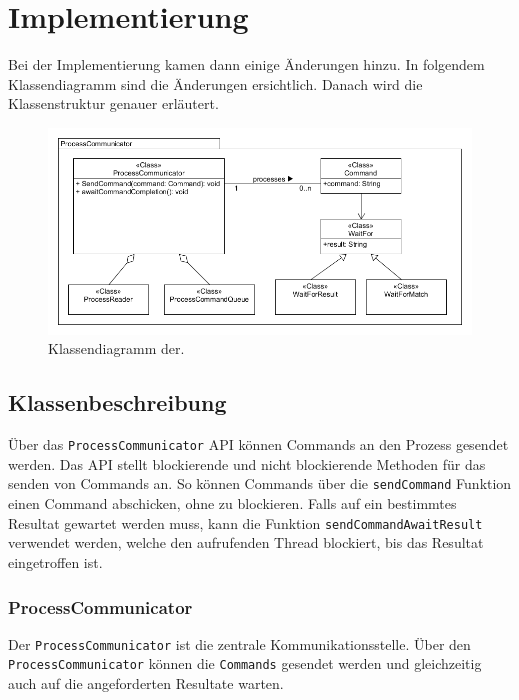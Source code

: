 \section{Implementierung}

Bei der Implementierung kamen dann einige Änderungen hinzu. In folgendem Klassendiagramm sind die Änderungen ersichtlich. Danach wird die Klassenstruktur genauer erläutert.

\begin{figure}

	\centering
		\includegraphics[scale=0.75]{forthcommunication/communicator.png}
		\caption{Klassendiagramm der.}
		\label{fig:communicator}

\end{figure}

\newpage

\subsection{Klassenbeschreibung}

Über das \verb!ProcessCommunicator! API können Commands an den Prozess gesendet werden. Das API stellt blockierende und nicht blockierende Methoden für das senden von Commands an. So können Commands über die \verb!sendCommand! Funktion einen Command abschicken, ohne zu blockieren. Falls auf ein bestimmtes Resultat gewartet werden muss, kann die Funktion \verb!sendCommandAwaitResult! verwendet werden, welche den aufrufenden Thread blockiert, bis das Resultat eingetroffen ist. 

\subsubsection{ProcessCommunicator}

Der \verb!ProcessCommunicator! ist die zentrale Kommunikationsstelle. Über den \\ \verb!ProcessCommunicator! können die \verb!Commands! gesendet werden und gleichzeitig auch auf die angeforderten Resultate warten.

